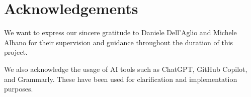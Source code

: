 

\section{Acknowledgements}\label{sec:acknowledgements}
We want to express our sincere gratitude to Daniele Dell'Aglio and Michele Albano for their supervision and guidance throughout the duration of this project.

We also acknowledge the usage of AI tools such as ChatGPT, GitHub Copilot, and Grammarly.
These have been used for clarification and implementation purposes.